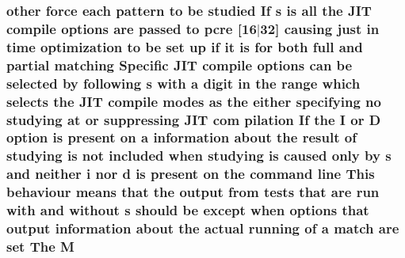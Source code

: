 \subsubsection[{\texorpdfstring{M}{M}}]{ other force each {\bf pattern} {\bf to} {\bf be} {\bf studied} If {\bf s} {\bf is} {\bf all} the J\+IT {\bf compile} {\bf options} {\bf are} passed {\bf to} {\bf pcre} \mbox{[}16$\vert$32\mbox{]} causing just {\bf in} {\bf time} optimization {\bf to} {\bf be} {\bf set} up {\bf if} {\bf it} {\bf is} for both full and {\bf partial} {\bf matching} Specific J\+IT {\bf compile} {\bf options} {\bf can} {\bf be} {\bf selected} by following {\bf s} {\bf with} {\bf a} digit {\bf in} the range {\bf which} selects the J\+IT {\bf compile} {\bf modes} {\bf as} the either {\bf specifying} no {\bf studying} at {\bf or} suppressing J\+IT com pilation If the {\bf I} {\bf or} {\bf D} {\bf option} {\bf is} {\bf present} {\bf on} {\bf a} information about the {\bf result} {\bf of} {\bf studying} {\bf is} {\bf not} {\bf included} when {\bf studying} {\bf is} caused only by {\bf s} and neither {\bf i} nor {\bf d} {\bf is} {\bf present} {\bf on} the {\bf command} {\bf line} This behaviour means that the {\bf output} {\bf from} {\bf tests} that {\bf are} {\bf run} {\bf with} and without {\bf s} should {\bf be} {\bf except} when {\bf options} that {\bf output} information about the actual running {\bf of} {\bf a} {\bf match} {\bf are} {\bf set} The M}\hypertarget{pcretest_8txt_ac33c897bd7ca5c35c9869e7b046d8e94}{}\label{pcretest_8txt_ac33c897bd7ca5c35c9869e7b046d8e94}
